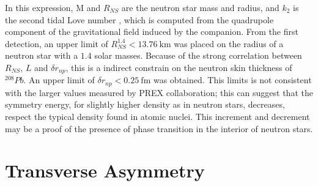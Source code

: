 In this expression, M and $R_{NS}$ are the neutron star mass and radius, and $k_{2}$ is the second tidal Love number \cite{Binnington:2009bb}, which is computed from the quadrupole component of the gravitational field induced by the companion. From the first detection, an upper limit of $R_{NS}^{1.4} < \SI{13.76}{\kilo \meter}$ was placed on the radius of a neutron star with a $1.4$ solar masses. Because of the strong correlation between $R_{NS}$, $L$ and $\delta r_{np}$, this is a indirect constrain on the neutron skin thickness of $^{208}Pb$. An upper limit of $\delta r_{np} < \SI{0.25}{\femto \meter}$ was obtained. This limits is not consistent with the larger values measured by PREX collaboration; this can suggest that the symmetry energy, for slightly higher density as in neutron stars, decreases, respect the typical density found in atomic nuclei. This increment and decrement may be a proof of the presence of phase transition in the interior of neutron stars.

\section{Transverse Asymmetry}

